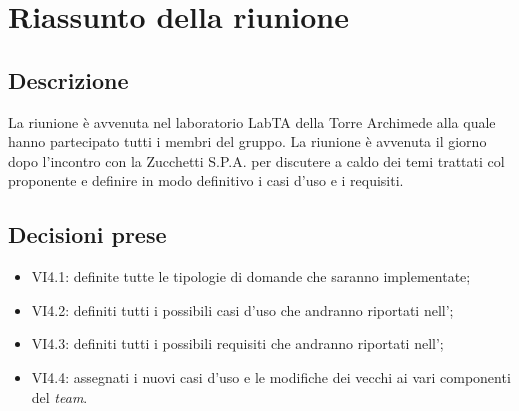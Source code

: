 \section{Riassunto della riunione}
\subsection{Descrizione}
La riunione è avvenuta nel laboratorio LabTA della Torre Archimede alla quale hanno partecipato tutti i membri del gruppo. La riunione è avvenuta il giorno dopo l'incontro con la Zucchetti S.P.A. per discutere a caldo dei temi trattati col proponente e definire in modo definitivo i casi d'uso e i requisiti.
\subsection{Decisioni prese}
\begin{itemize}
\item VI4.1: definite tutte le tipologie di domande che saranno implementate;
\item VI4.2: definiti tutti i possibili casi d'uso che andranno riportati nell'\AdR;
\item VI4.3: definiti tutti i possibili requisiti che andranno riportati nell'\AdR;
\item VI4.4: assegnati i nuovi casi d'uso e le modifiche dei vecchi ai vari componenti del \textit{team}.
\end{itemize}